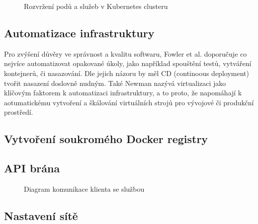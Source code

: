 \documentclass[thesis=M,czech]{FITthesis}[2019/12/23]
\theoremstyle{plain}
\theoremstyle{definition}
\begin{document}
\begin{figure}[H]\centering
	

	\caption[Rozvržení podů a služeb v Kubernetes clusteru]{Rozvržení podů a služeb v Kubernetes clusteru}\label{fig:float}
\end{figure}







\subsection{Automatizace infrastruktury}

Pro zvýšení důvěry ve správnost a kvalitu softwaru, Fowler et al. \cite{microservices-article} doporučuje co nejvíce automatizovat opakované úkoly, jako například spouštění testů, vytváření kontejnerů, či nasazování. Dle jejich názoru by měl CD (continoous deployment) tvořit nasazení doslovně nudným. Také Newman \cite{microservices-book} nazývá virtualizaci jako klíčovým faktorem k automatizaci infrastruktury, a to proto, že napomáhají k aotumatickému vytvoření a škálování virtuálních strojů pro vývojové či produkční prostředí.



\subsection{Vytvoření soukromého Docker registry}




\subsection{API brána}


\begin{figure}[H]\centering
	

	\caption[Diagram komunikace klienta se službou]{Diagram komunikace klienta se službou}\label{fig:float}
\end{figure}



\subsection{Nastavení sítě}
\end{document}
